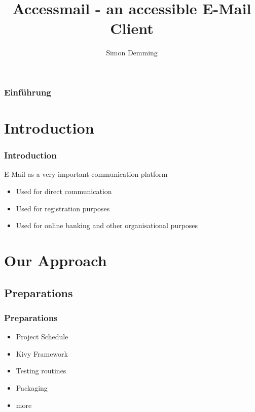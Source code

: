 \documentclass[9pt]{beamer}
\title{Accessmail - an accessible E-Mail Client}
\author{Simon Demming}
\institute[Department]{\par\smallskip\smallskip Department for Rehabilitation\\ Department for Computer Science}
\begin{document}
	\begin{frame}
		\setcounter{framenumber}{0}
	    \titlepage
	\end{frame}
	
	\begin{frame}
	    \frametitle{Einführung}
	    \tableofcontents
	\end{frame}
	
	\section{Introduction}
		\begin{frame}
			\frametitle{Introduction}
			
			E-Mail as a very important communication platform
			\begin{itemize}
				\item Used for direct communication
				\item Used for registration purposes
				\item Used for online banking and other organisational purposes
			\end{itemize}
		
		\end{frame}
	
	
	
	
	\section{Our Approach}
		\subsection{Preparations}
		
			\begin{frame}
				\frametitle{Preparations}
				\begin{itemize}
					\item Project Schedule
					\item Kivy Framework
					\item Testing routines
					\item Packaging
					\item more
				\end{itemize}
			\end{frame}
			
\end{document}
